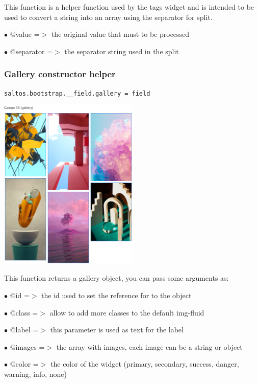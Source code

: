 \documentclass[a4paper]{article}
\begin{document}
This function is a helper function used by the tags widget and is intended
to be used to convert a string into an array using the separator for split.

\begin{compactitem}
\item[\color{myblue}$\bullet$] @value     =$>$ the original value that must to be processed
\item[\color{myblue}$\bullet$] @separator =$>$ the separator string used in the split
\end{compactitem}

\hypertarget{toc84}{}
\subsubsection{Gallery constructor helper}

\begin{lstlisting}
saltos.bootstrap.__field.gallery = field
\end{lstlisting}

\begin{center}\includegraphics[width=0.5\textwidth]{../ujest/snaps/test-bootstrap-js-bootstrap-campo-35-gallery-1-snap.png}\end{center}

This function returns a gallery object, you can pass some arguments as:

\begin{compactitem}
\item[\color{myblue}$\bullet$] @id     =$>$ the id used to set the reference for to the object
\item[\color{myblue}$\bullet$] @class  =$>$ allow to add more classes to the default img-fluid
\item[\color{myblue}$\bullet$] @label  =$>$ this parameter is used as text for the label
\item[\color{myblue}$\bullet$] @images =$>$ the array with images, each image can be a string or object
\item[\color{myblue}$\bullet$] @color  =$>$ the color of the widget (primary, secondary, success, danger, warning, info, none)
\end{compactitem}
\end{document}

